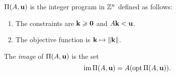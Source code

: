 \documentclass[11pt]{amsart}
\begin{document}
\begin{definition}
$\Pi(A, \mathbf{u})$ is the integer program in $\mathbb{Z}^n$ defined as follows:
\begin{enumerate}
\item The constraints are $\mathbf{k} \geqslant \mathbf{0}$ and $A \mathbf{k} < \mathbf{u}$. 
\item The objective function is $\mathbf{k} \mapsto \| \mathbf{k} \|$.
\end{enumerate}
\end{definition}

\begin{definition}
The \emph{image} of $\Pi(A, \mathbf{u})$ is the set \[ \operatorname{im} \Pi(A, \mathbf{u}) = A ( \operatorname{opt} \Pi(A, \mathbf{u}) ). \] 
\end{definition}


\end{document}
